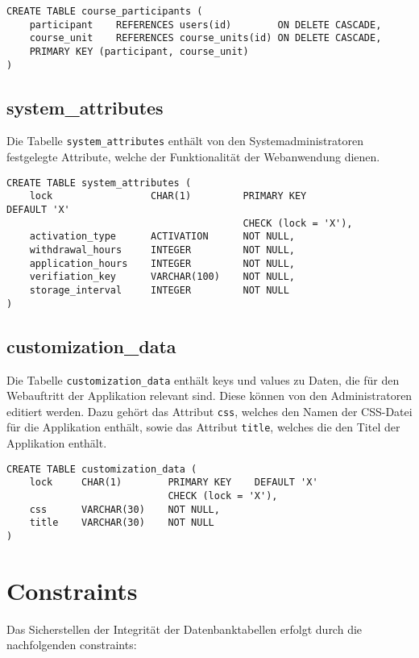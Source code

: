 \begin{verbatim}
CREATE TABLE course_participants (
    participant    REFERENCES users(id)        ON DELETE CASCADE,
    course_unit    REFERENCES course_units(id) ON DELETE CASCADE,
    PRIMARY KEY (participant, course_unit)
)
\end{verbatim}

\subsection{system\_attributes}
Die Tabelle \texttt{system\_attributes} enthält von den Systemadministratoren festgelegte Attribute, welche der Funktionalität der Webanwendung dienen.

\begin{verbatim}
CREATE TABLE system_attributes (
    lock                 CHAR(1)         PRIMARY KEY    									 DEFAULT 'X'
                                         CHECK (lock = 'X'),
    activation_type      ACTIVATION      NOT NULL,
    withdrawal_hours     INTEGER         NOT NULL,
    application_hours    INTEGER         NOT NULL,
    verifiation_key      VARCHAR(100)    NOT NULL,
    storage_interval     INTEGER         NOT NULL
)
\end{verbatim}

\subsection{customization\_data}
Die Tabelle \texttt{customization\_data} enthält keys und values zu Daten, die für den Webauftritt der Applikation relevant sind. Diese können von den Administratoren editiert werden. Dazu gehört das Attribut \texttt{css}, welches den Namen der CSS-Datei für die Applikation enthält, sowie das Attribut \texttt{title}, welches die den Titel der Applikation enthält.

\begin{verbatim}
CREATE TABLE customization_data (
    lock     CHAR(1)        PRIMARY KEY    DEFAULT 'X'
                            CHECK (lock = 'X'),
    css      VARCHAR(30)    NOT NULL,
    title    VARCHAR(30)    NOT NULL
)
\end{verbatim}

\section{Constraints}
Das Sicherstellen der Integrität der Datenbanktabellen erfolgt durch die nachfolgenden constraints:

